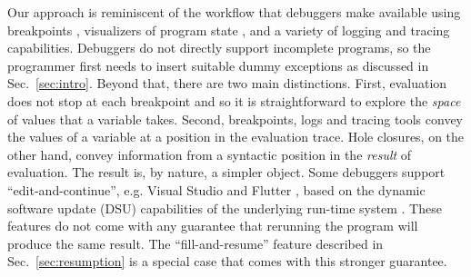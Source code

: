 
Our approach is reminiscent of the workflow that debuggers make available using breakpoints \cite{fitzgerald2008debugging,DBLP:journals/jfp/TolmachA95}, visualizers of program state \cite{Nelson2017,Guo13}, and a variety of logging and tracing capabilities.
%
Debuggers do not directly support incomplete programs, so the programmer first needs to insert suitable dummy exceptions as discussed in Sec.~\ref{sec:intro}.
%
Beyond that, there are two main distinctions. First, evaluation does not stop at each breakpoint and so it is straightforward to explore the \emph{space} of values that a variable takes. Second, breakpoints, logs and tracing tools convey the values of a variable at a position in the evaluation trace. Hole closures, on the other hand, convey information from a syntactic position in the \emph{result} of evaluation. The result is, by nature, a simpler object. %
Some debuggers support ``edit-and-continue'', e.g. Visual Studio \cite{VSEditAndContinue} and Flutter \cite{flutter}, based on the dynamic software update (DSU) capabilities of the underlying run-time system \cite{DBLP:journals/toplas/StoyleHBSN07,DBLP:conf/vstte/HaydenMHFF12,DBLP:journals/toplas/HicksN05}. These features do not come with any guarantee that rerunning the program will produce the same result. The ``fill-and-resume'' feature described in Sec.~\ref{sec:resumption} is a special case that comes with this stronger guarantee.


